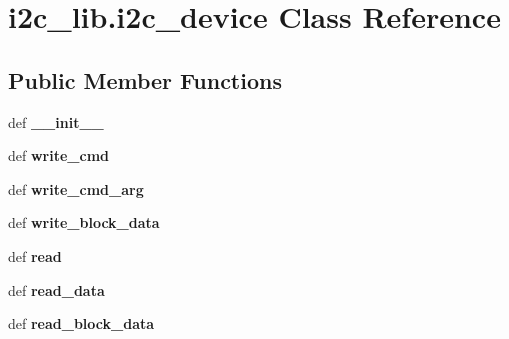 \hypertarget{classi2c__lib_1_1i2c__device}{}\section{i2c\+\_\+lib.\+i2c\+\_\+device Class Reference}
\label{classi2c__lib_1_1i2c__device}
\subsection*{Public Member Functions}
\begin{DoxyCompactItemize}
\item 
\hypertarget{classi2c__lib_1_1i2c__device_afe809fbacb8516d0598b1a2ed9f3bb31}{}def {\bfseries \+\_\+\+\_\+init\+\_\+\+\_\+}\label{classi2c__lib_1_1i2c__device_afe809fbacb8516d0598b1a2ed9f3bb31}

\item 
\hypertarget{classi2c__lib_1_1i2c__device_af32730e22001e6593151d45d5078ec09}{}def {\bfseries write\+\_\+cmd}\label{classi2c__lib_1_1i2c__device_af32730e22001e6593151d45d5078ec09}

\item 
\hypertarget{classi2c__lib_1_1i2c__device_aa3d8df433b3be034a921c1e15eaf0456}{}def {\bfseries write\+\_\+cmd\+\_\+arg}\label{classi2c__lib_1_1i2c__device_aa3d8df433b3be034a921c1e15eaf0456}

\item 
\hypertarget{classi2c__lib_1_1i2c__device_a92b3ddfb4989ba34a4f64170c3196637}{}def {\bfseries write\+\_\+block\+\_\+data}\label{classi2c__lib_1_1i2c__device_a92b3ddfb4989ba34a4f64170c3196637}

\item 
\hypertarget{classi2c__lib_1_1i2c__device_ae3c629c0fef21c4fcfa59972e4bb7b8d}{}def {\bfseries read}\label{classi2c__lib_1_1i2c__device_ae3c629c0fef21c4fcfa59972e4bb7b8d}

\item 
\hypertarget{classi2c__lib_1_1i2c__device_a5848805914a8521974ed1829c2973f06}{}def {\bfseries read\+\_\+data}\label{classi2c__lib_1_1i2c__device_a5848805914a8521974ed1829c2973f06}

\item 
\hypertarget{classi2c__lib_1_1i2c__device_a08fcf0ed296210bb521c3627c633c4a6}{}def {\bfseries read\+\_\+block\+\_\+data}\label{classi2c__lib_1_1i2c__device_a08fcf0ed296210bb521c3627c633c4a6}

\end{DoxyCompactItemize}

